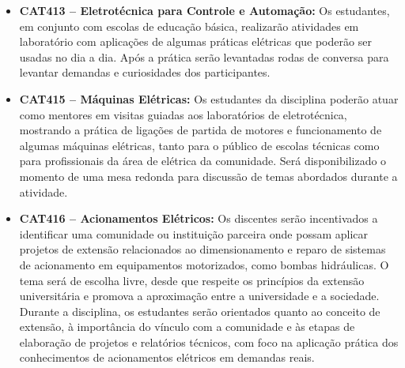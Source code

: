 \documentclass[
	12pt,				%
	openright,			%
	oneside,			%
	a4paper,			%
	english,			%
	brazil				%
	]{abntex2}
\begin{document}
\begin{itemize}
    \item \textbf{CAT413 -- Eletrotécnica para Controle e Automação:} Os estudantes, em conjunto com escolas de educação básica, realizarão atividades em laboratório com aplicações de algumas práticas elétricas que poderão ser usadas no dia a dia. Após a prática serão levantadas rodas de conversa para levantar demandas e curiosidades dos participantes.

    \item \textbf{CAT415 -- Máquinas Elétricas:} Os estudantes da disciplina poderão atuar como mentores em visitas guiadas aos laboratórios de eletrotécnica, mostrando a prática de ligações de partida de motores e funcionamento de algumas máquinas elétricas, tanto para o público de escolas técnicas como para profissionais da área de elétrica da comunidade.  Será disponibilizado o momento de uma mesa redonda para discussão de temas abordados durante a atividade.

    \item \textbf{CAT416 -- Acionamentos Elétricos:} Os discentes serão incentivados a identificar uma comunidade ou instituição parceira onde possam aplicar projetos de extensão relacionados ao dimensionamento e reparo de sistemas de acionamento em equipamentos motorizados, como bombas hidráulicas. O tema será de escolha livre, desde que respeite os princípios da extensão universitária e promova a aproximação entre a universidade e a sociedade. Durante a disciplina, os estudantes serão orientados quanto ao conceito de extensão, à importância do vínculo com a comunidade e às etapas de elaboração de projetos e relatórios técnicos, com foco na aplicação prática dos conhecimentos de acionamentos elétricos em demandas reais.


\end{itemize}
\end{document}
